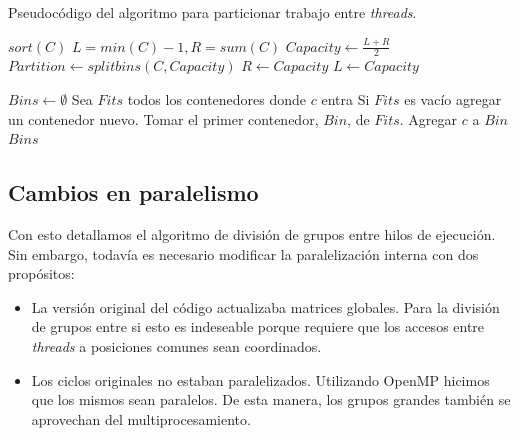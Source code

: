 \begin{algorithm}[H]
    \caption{Pseudoc\'odigo del algoritmo para particionar trabajo entre \textit{threads}.}
    \label{algo:partition-algo}
    \begin{algorithmic}
            \State $sort(C)$
            \State $L = min(C)-1, R = sum(C)$
                \Comment{Invariante: $(L, \dots, R]$ contiene la capacidad m\'axima.}
                \State $Capacity \gets \frac{L+R}{2}$
                \State $Partition \gets splitbins(C,Capacity)$
                    \State $R \gets Capacity$
                \Else
                    \State $L \gets Capacity$
                \EndIf
            \EndWhile

            \State {}
        \EndFunction

            \State $Bins \gets \emptyset$
                \State Sea $Fits$ todos los contenedores donde $c$ entra
                \State Si $Fits$ es vac\'io agregar un contenedor nuevo.
                \State Tomar el primer contenedor, $Bin$, de $Fits$.
                \State Agregar $c$ a $Bin$
            \EndFor
            \State \Return $Bins$
        \EndFunction
    \end{algorithmic}
\end{algorithm}

\subsection{Cambios en paralelismo}

Con esto detallamos el algoritmo de divisi\'on de grupos entre hilos de ejecuci\'on.
Sin embargo, todav\'ia es necesario modificar la paralelizaci\'on interna con dos
prop\'ositos:

\begin{itemize}
    \item La versi\'on original del c\'odigo actualizaba matrices globales. Para
    la divisi\'on de grupos entre si esto es indeseable porque requiere que los
    accesos entre \textit{threads} a posiciones comunes sean coordinados.
    \item Los ciclos originales no estaban paralelizados. Utilizando OpenMP
    hicimos que los mismos sean paralelos. De esta manera, los grupos grandes
    tambi\'en se aprovechan del multiprocesamiento.
\end{itemize}


